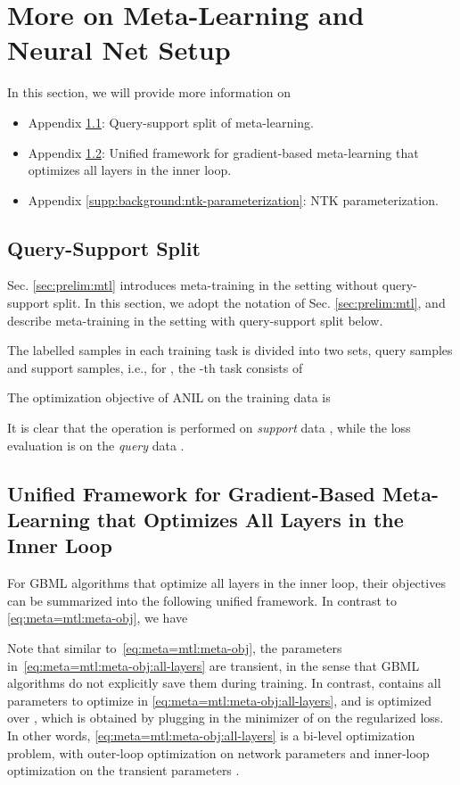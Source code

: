\documentclass{article}
\begin{document}
\section{More on Meta-Learning and Neural Net Setup}\label{supp:background}
In this section, we will provide more information on
\begin{itemize}
    \item Appendix \ref{supp:background:query-support-split}: Query-support split of meta-learning.
    \item Appendix \ref{supp:background:unified-framework}: Unified framework for gradient-based meta-learning that optimizes all layers in the inner loop.
    \item Appendix \ref{supp:background:ntk-parameterization}: NTK parameterization.
\end{itemize}

\subsection{Query-Support Split}\label{supp:background:query-support-split}
Sec. \ref{sec:prelim:mtl} introduces meta-training in the setting without query-support split. In this section, we adopt the notation of Sec. \ref{sec:prelim:mtl}, and describe meta-training in the setting with query-support split below.

The  labelled samples in each training task is divided into two sets,  query samples and  support samples, i.e., for , the -th task consists of 

The optimization objective of ANIL on the training data  is

It is clear that the  operation is performed on \textit{support} data , while the loss evaluation is on the \textit{query} data .

\subsection{Unified Framework for Gradient-Based Meta-Learning that Optimizes All Layers in the Inner Loop}\label{supp:background:unified-framework}

For GBML algorithms that optimize all layers in the inner loop, their objectives can be summarized into the following unified framework. In contrast to \eqref{eq:meta=mtl:meta-obj}, we have

Note that similar to~\eqref{eq:meta=mtl:meta-obj}, the parameters  in~\eqref{eq:meta=mtl:meta-obj:all-layers} are transient, in the sense that GBML algorithms do not explicitly save them during training. In contrast,  contains all parameters to optimize in \eqref{eq:meta=mtl:meta-obj:all-layers}, and  is optimized over , which is obtained by plugging in the minimizer of  on the regularized loss. In other words, \eqref{eq:meta=mtl:meta-obj:all-layers} is a bi-level optimization problem, with outer-loop optimization on network parameters  and inner-loop optimization on the transient parameters .
\end{document}
